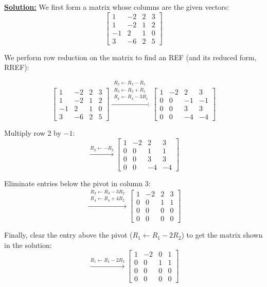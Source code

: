 \bigskip
\noindent
\underline{\textbf{Solution:}} We first form a matrix whose columns are the given vectors:
\[
\begin{bmatrix}
 1 & -2 & 2 & 3 \\
 1 & -2 & 1 & 2 \\
-1 &  2 & 1 & 0 \\
 3 & -6 & 2 & 5
\end{bmatrix}
\]

We perform row reduction on the matrix to find an REF (and its reduced form, RREF):

\[
\begin{bmatrix}
 1 & -2 & 2 & 3 \\
 1 & -2 & 1 & 2 \\
-1 &  2 & 1 & 0 \\
 3 & -6 & 2 & 5
\end{bmatrix}
\xrightarrow{\substack{R_2 \leftarrow R_2 - R_1 \\ R_3 \leftarrow R_3 + R_1 \\ R_4 \leftarrow R_4 - 3R_1}}
\begin{bmatrix}
1 & -2 &  2 &  3 \\
0 &  0 & -1 & -1 \\
0 &  0 &  3 &  3 \\
0 &  0 & -4 & -4
\end{bmatrix}
\]

Multiply row 2 by $-1$:
\[
\xrightarrow{R_2 \leftarrow -R_2}
\begin{bmatrix}
1 & -2 & 2 & 3 \\
0 &  0 & 1 & 1 \\
0 &  0 & 3 & 3 \\
0 &  0 & -4 & -4
\end{bmatrix}
\]

Eliminate entries below the pivot in column 3:
\[
\xrightarrow{\substack{R_3 \leftarrow R_3 - 3R_2 \\ R_4 \leftarrow R_4 + 4R_2}}
\begin{bmatrix}
1 & -2 & 2 & 3 \\
0 &  0 & 1 & 1 \\
0 &  0 & 0 & 0 \\
0 &  0 & 0 & 0
\end{bmatrix}
\]

Finally, clear the entry above the pivot ($R_1 \leftarrow R_1 - 2R_2$) to get the matrix shown in the solution:
\[
\xrightarrow{R_1 \leftarrow R_1 - 2R_2}
\begin{bmatrix}
1 & -2 & 0 & 1 \\
0 &  0 & 1 & 1 \\
0 &  0 & 0 & 0 \\
0 &  0 & 0 & 0
\end{bmatrix}
\]

